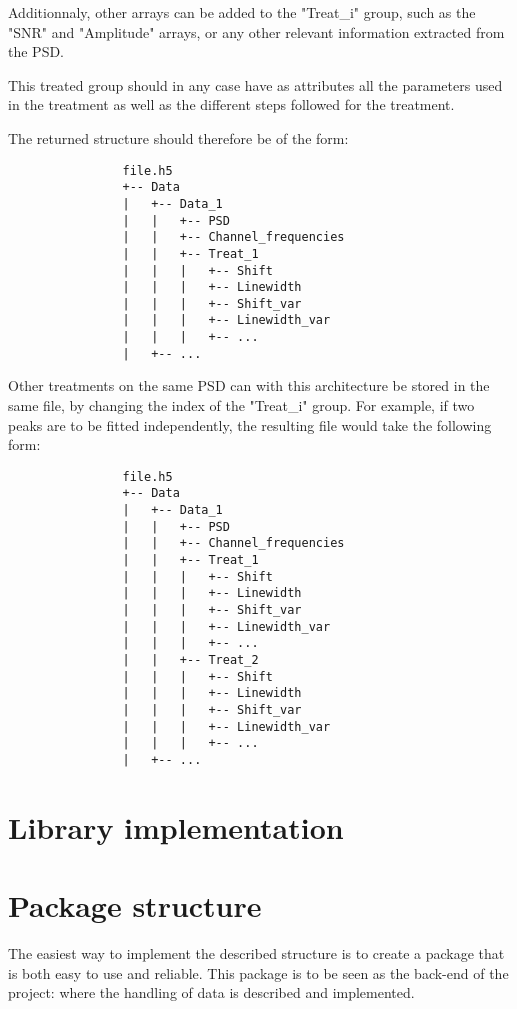 \documentclass{article}
\begin{document}
            Additionnaly, other arrays can be added to the "Treat\_i" group, such as the "SNR" and "Amplitude" arrays, or any other relevant information extracted from the PSD.

            This treated group should in any case have as attributes all the parameters used in the treatment as well as the different steps followed for the treatment. 

            The returned structure should therefore be of the form:
            \begin{verbatim}
                file.h5
                +-- Data
                |   +-- Data_1
                |   |   +-- PSD
                |   |   +-- Channel_frequencies
                |   |   +-- Treat_1
                |   |   |   +-- Shift
                |   |   |   +-- Linewidth
                |   |   |   +-- Shift_var
                |   |   |   +-- Linewidth_var
                |   |   |   +-- ...
                |   +-- ...
            \end{verbatim}

            Other treatments on the same PSD can with this architecture be stored in the same file, by changing the index of the "Treat\_i" group. For example, if two peaks are to be fitted independently, the resulting file would take the following form:

            \begin{verbatim}
                file.h5
                +-- Data
                |   +-- Data_1
                |   |   +-- PSD
                |   |   +-- Channel_frequencies
                |   |   +-- Treat_1
                |   |   |   +-- Shift
                |   |   |   +-- Linewidth
                |   |   |   +-- Shift_var
                |   |   |   +-- Linewidth_var
                |   |   |   +-- ...
                |   |   +-- Treat_2
                |   |   |   +-- Shift
                |   |   |   +-- Linewidth
                |   |   |   +-- Shift_var
                |   |   |   +-- Linewidth_var
                |   |   |   +-- ...
                |   +-- ...
            \end{verbatim}

\section{Library implementation}

    \section{Package structure}
            
        The easiest way to implement the described structure is to create a package that is both easy to use and reliable. This package is to be seen as the back-end of the project: where the handling of data is described and implemented.
\end{document}
